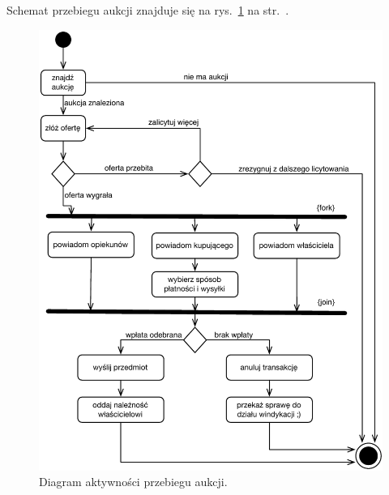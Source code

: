 \documentclass[10pt,a4paper]{article}
\begin{document}
Schemat przebiegu aukcji znajduje się na
rys.~\ref{fig:aktywnosc_przebieg_aukcji} na
str.~\pageref{fig:aktywnosc_przebieg_aukcji}.

\begin{figure}[ht]
  \begin{adjustwidth}{-2cm}{-2cm}
    \centering
    \includegraphics{figury/aktywnosc-przebieg-aukcji}
    \caption{Diagram aktywności przebiegu aukcji.}
    \label{fig:aktywnosc_przebieg_aukcji}
  \end{adjustwidth}
\end{figure}
\end{document}
